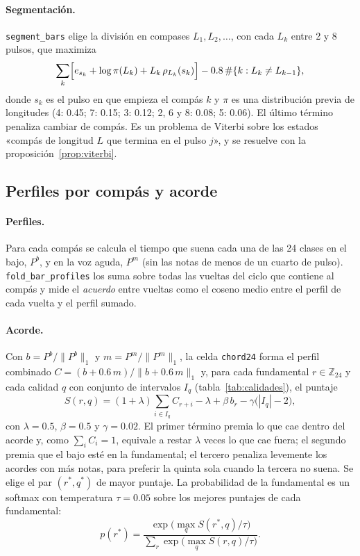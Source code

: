 \paragraph{Segmentación.} \texttt{segment\_bars} elige la división en compases $L_1, L_2, \dots$, con cada $L_k$ entre 2 y
8 pulsos, que maximiza
\[
  \sum_k \Bigl[ e_{s_k} + \log \pi(L_k) + L_k\, \rho_{L_k}(s_k) \Bigr] - 0.8\, \#\{k : L_k \ne L_{k-1}\},
\]
donde $s_k$ es el pulso en que empieza el compás $k$ y $\pi$ es una distribución previa de longitudes (4: 0.45; 7: 0.15;
3: 0.12; 2, 6 y 8: 0.08; 5: 0.06). El último término penaliza cambiar de compás. Es un problema de Viterbi sobre los
estados «compás de longitud $L$ que termina en el pulso $j$», y se resuelve con la proposición~\ref{prop:viterbi}.

\subsection{Perfiles por compás y acorde}

\paragraph{Perfiles.} Para cada compás se calcula el tiempo que suena cada una de las 24 clases en el bajo, $P^b$, y en la
voz aguda, $P^m$ (sin las notas de menos de un cuarto de pulso). \texttt{fold\_bar\_profiles} los suma sobre todas las
vueltas del ciclo que contiene al compás y mide el \emph{acuerdo} entre vueltas como el coseno medio entre el perfil de
cada vuelta y el perfil sumado.

\paragraph{Acorde.} Con $b = P^b / \|P^b\|_1$ y $m = P^m / \|P^m\|_1$, la celda \texttt{chord24} forma el perfil combinado
$C = (b + 0.6\, m) / \|b + 0.6\, m\|_1$ y, para cada fundamental $r \in \mathbb{Z}_{24}$ y cada calidad $q$ con conjunto de
intervalos $I_q$ (tabla~\ref{tab:calidades}), el puntaje
\[
  S(r, q) = (1 + \lambda) \sum_{i \in I_q} C_{r+i} - \lambda + \beta\, b_r - \gamma \bigl(|I_q| - 2\bigr),
\]
con $\lambda = 0.5$, $\beta = 0.5$ y $\gamma = 0.02$. El primer término premia lo que cae dentro del acorde y, como
$\sum_i C_i = 1$, equivale a restar $\lambda$ veces lo que cae fuera; el segundo premia que el bajo esté en la
fundamental; el tercero penaliza levemente los acordes con más notas, para preferir la quinta sola cuando la tercera no
suena. Se elige el par $(r^*, q^*)$ de mayor puntaje. La probabilidad de la fundamental es un softmax con temperatura
$\tau = 0.05$ sobre los mejores puntajes de cada fundamental:
\[
  p(r^*) = \frac{\exp\bigl(\max_q S(r^*, q)/\tau\bigr)}{\sum_{r} \exp\bigl(\max_q S(r, q)/\tau\bigr)}.
\]

